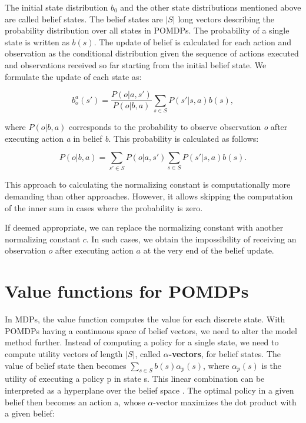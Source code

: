 
The initial state distribution $b_0$ and the other state distributions mentioned above are called belief states. The belief states are $|S|$ long vectors describing the probability distribution over all states in POMDPs. The probability of a single state is written as $b(s)$. The update of belief is calculated for each action and observation as the conditional distribution given the sequence of actions executed and observations received so far starting from the initial belief state. We formulate the update of each state as:

\begin{equation} \label{eq:bao} b_o^a(s') = \dfrac{P(o|a, s')}{P(o|b, a)} \sum_{s \in S} P(s'|s, a) b(s),\end{equation}

where $P(o|b, a)$ corresponds to the probability to observe observation \textit{o} after executing action \textit{a} in belief \textit{b}. This probability is calculated as follows:

\begin{equation} P(o|b, a) = \sum_{s' \in S} P(o|a, s')\sum_{s \in S} P(s'|s, a)b(s).\end{equation}

This approach to calculating the normalizing constant is computationally more demanding than other approaches. However, it allows skipping the computation of the inner sum in cases where the probability is zero.

If deemed appropriate, we can replace the normalizing constant with another normalizing constant $c$. In such cases, we obtain the impossibility of receiving an observation $o$ after executing action $a$ at the very end of the belief update.


\section{Value functions for POMDPs}
In MDPs, the value function computes the value for each discrete state. With POMDPs having a continuous space of belief vectors, we need to alter the model method further. Instead of computing a policy for a single state, we need to compute utility vectors of length $|S|$, called \textbf{$\alpha$-vectors}, for belief states. The value of belief state then becomes $\sum_{s \in S} b(s) \alpha_p(s)$, where $\alpha_p(s)$ is the utility of executing a policy p in state s. This linear combination can be interpreted as a hyperplane over the belief space \cite{pbvi}. The optimal policy in a given belief then becomes an action a, whose $\alpha$-vector maximizes the dot product with a given belief:

